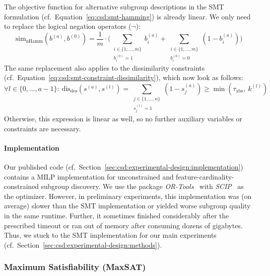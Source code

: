 \documentclass{article}
\theoremstyle{definition}
\begin{document}
The objective function for alternative subgroup descriptions in the SMT formulation (cf.~Equation~\ref{eq:csd:smt-hamming}) is already linear.
We only need to replace the logical negation operators ($\lnot$):
%
\begin{equation}
	\text{sim}_{\text{nHamm}}(b^{(a)}, b^{(0)}) = \frac{1}{m} \cdot \Big( \sum\limits_{\substack{i \in \{1, \dots, m\} \\ b_i^{(0)} = 1}} b_i^{(a)} + \sum\limits_{\substack{i \in \{1, \dots, m\} \\ b_i^{(0)} = 0}} \left( 1 - b_i^{(a)} \right) \Big)
	\label{eq:csd:mip-hamming}
\end{equation}
%
The same replacement also applies to the dissimilarity constraints (cf.~Equation~\ref{eq:csd:smt-constraint-dissimilarity}), which now look as follows:
%
\begin{equation}
	\forall l \in \{0, \dots, a-1\}:~ \text{dis}_{\text{des}}(s^{(a)}, s^{(l)}) = \sum_{\substack{j \in \{1, \dots, n\} \\ s^{(l)}_j = 1}} \left(1 - s^{(a)}_j \right) \geq \min \left( \tau_{\text{abs}},~k^{(l)} \right)
	\label{eq:csd:mip-constraint-dissimilarity}
\end{equation}
%
Otherwise, this expression is linear as well, so no further auxiliary variables or constraints are necessary.

\paragraph{Implementation}

Our published code (cf.~Section~\ref{sec:csd:experimental-design:implementation}) contains a MILP implementation for unconstrained and feature-cardinality-constrained subgroup discovery.
We use the package \emph{OR-Tools}~\cite{perron2022or-tools} with \emph{SCIP}~\cite{bestuzheva2021scip} as the optimizer.
However, in preliminary experiments, this implementation was (on average) slower than the SMT implementation or yielded worse subgroup quality in the same runtime.
Further, it sometimes finished considerably after the prescribed timeout or ran out of memory after consuming dozens of gigabytes.
Thus, we stuck to the SMT implementation for our main experiments (cf.~Section~\ref{sec:csd:experimental-design:methods}).

\subsubsection{Maximum Satisfiability (MaxSAT)}
\label{sec:csd:appendix:further-encodings:max-sat}
\end{document}
